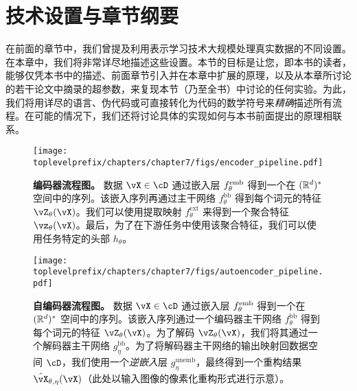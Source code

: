 \documentclass[../../book-main_zh.tex]{subfiles}
\begin{document}
\section{技术设置与章节纲要}\label{sec:experiment_setup}

在前面的章节中，我们曾提及利用表示学习技术大规模处理真实数据的不同设置。在本章中，我们将非常详尽地描述这些设置。本节的目标是让您，即本书的读者，能够仅凭本书中的描述、前面章节引入并在本章中扩展的原理，以及从本章所讨论的若干论文中摘录的超参数，来复现本节（乃至全书）中讨论的任何实验。为此，我们将用详尽的语言、伪代码或可直接转化为代码的数学符号来\textit{精确}描述所有流程。在可能的情况下，我们还将讨论具体的实现如何与本书前面提出的原理相联系。

\begin{figure}
    \texttt{[image: \\toplevelprefix/chapters/chapter7/figs/encoder\_pipeline.pdf]}
    \caption{\small\textbf{编码器流程图。} 数据 \(\vX \in \cD\) 通过嵌入层 \(f_{\theta}^{\mathrm{emb}}\) 得到一个在 \((\mathbb{R}^{d})^{*}\) 空间中的序列。该嵌入序列再通过主干网络 \(f_{\theta}^{\mathrm{bb}}\) 得到每个词元的特征 \(\vZ_{\theta}(\vX)\)。我们可以使用提取映射 \(f_{\theta}^{\mathrm{ext}}\) 来得到一个聚合特征 \(\vz_{\theta}(\vX)\)。最后，为了在下游任务中使用该聚合特征，我们可以使用任务特定的头部 \(h_{\theta}\)。}
    \label{fig:overall_encoder_pipeline}
\end{figure}

\begin{figure}
    \texttt{[image: \\toplevelprefix/chapters/chapter7/figs/autoencoder\_pipeline.pdf]}
    \caption{\small\textbf{自编码器流程图。} 数据 \(\vX \in \cD\) 通过嵌入层 \(f_{\theta}^{\mathrm{emb}}\) 得到一个在 \((\mathbb{R}^{d})^{*}\) 空间中的序列。该嵌入序列通过一个编码器主干网络 \(f_{\theta}^{\mathrm{bb}}\) 得到每个词元的特征 \(\vZ_{\theta}(\vX)\)。为了解码 \(\vZ_{\theta}(\vX)\)，我们将其通过一个解码器主干网络 \(g_{\eta}^{\mathrm{bb}}\)。为了将解码器主干网络的输出映射回数据空间 \(\cD\)，我们使用一个\textit{逆嵌入}层 \(g_{\eta}^{\mathrm{unemb}}\)，最终得到一个重构结果 \(\hat{\vX}_{\theta, \eta}(\vX)\)（此处以输入图像的像素化重构形式进行示意）。}
    \label{fig:overall_autoencoder_pipeline}
\end{figure}
\end{document}
